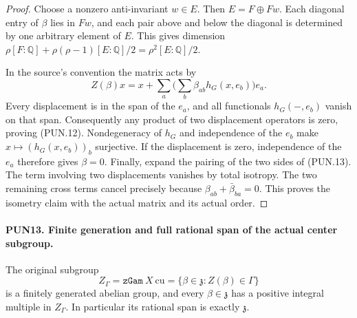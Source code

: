 \begin{proof}
Choose a nonzero anti-invariant \(w\in E\).  Then
\(E=F\oplus Fw\).  Each diagonal entry of \(\beta\) lies in
\(Fw\), and each pair above and below the diagonal is determined
by one arbitrary element of \(E\).  This gives dimension
\(\rho[F:\mathbb Q]+\rho(\rho-1)[E:\mathbb Q]/2
=\rho^2[E:\mathbb Q]/2\).

In the source's convention the matrix acts by
\[
 Z(\beta)x=x+\sum_a\Big(\sum_b\beta_{ab}h_G(x,e_b)\Big)e_a.
 \tag{PUN.13}
\]
Every displacement is in the span of the \(e_a\), and all
functionals \(h_G(-,e_b)\) vanish on that span.  Consequently
any product of two displacement operators is zero, proving
(PUN.12).  Nondegeneracy of \(h_G\) and independence of the
\(e_b\) make \(x\mapsto(h_G(x,e_b))_b\) surjective.
If the displacement is zero, independence of the \(e_a\)
therefore gives \(\beta=0\).  Finally, expand the pairing of
the two sides of (PUN.13).  The term involving two
displacements vanishes by total isotropy.  The two remaining
cross terms cancel precisely because
\(\beta_{ab}+\bar\beta_{ba}=0\).  This proves the isometry
claim with the actual matrix and its actual order.
\end{proof}

\paragraph{PUN13. Finite generation and full rational span of the actual center subgroup.}
\label{claim:PUN13}
The original subgroup
\[
 Z_\Gamma=\texttt{zGam}\ X\ \mathrm{cu}
       =\{\beta\in\mathfrak z:Z(\beta)\in\Gamma\}
 \tag{PUN.14}
\]
is a finitely generated abelian group, and every
\(\beta\in\mathfrak z\) has a positive integral multiple in
\(Z_\Gamma\).  In particular its rational span is exactly
\(\mathfrak z\).

